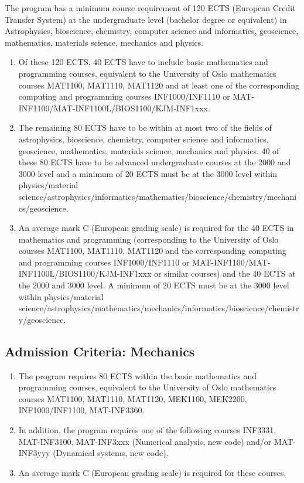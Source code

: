 \documentclass[%
oneside,                 %
final,                   %
10pt]{article}
\begin{document}
The program has a minimum course requirement of 120 ECTS (European Credit Transfer System) at the undergraduate level (bachelor degree or equivalent) in Astrophysics, bioscience, chemistry, computer science and informatics, geoscience, mathematics, materials science, mechanics and physics. 
\begin{enumerate}
\item Of these 120 ECTS, 40 ECTS have to include basic mathematics and programming courses, equivalent to the University of Oslo mathematics courses MAT1100, MAT1110, MAT1120 and at least one of the corresponding computing and programming courses INF1000/INF1110 or MAT-INF1100/MAT-INF1100L/BIOS1100/KJM-INF1xxx. 

\item The remaining 80 ECTS have to be within at most two of the fields of astrophysics, bioscience, chemistry, computer science and informatics, geoscience, mathematics, materials science, mechanics and physics. 40 of these 80 ECTS have to be advanced undergraduate courses at the 2000 and 3000 level and a minimum of 20 ECTS must be at the 3000 level within physics/material science/astrophysics/informatics/mathematics/bioscience/chemistry/mechanics/geoscience.

\item An average mark C (European grading scale) is required for the 40 ECTS in mathematics and programming (corresponding  to the University of Oslo courses  MAT1100, MAT1110, MAT1120  and the corresponding computing and programming courses INF1000/INF1110 or MAT-INF1100/MAT-INF1100L/BIOS1100/KJM-INF1xxx or similar courses) and the 40 ECTS at the 2000 and 3000 level. A minimum of 20 ECTS must be at the 3000 level within physics/material science/astrophysics/mathematics/mechanics/informatics/bioscience/chemistry/geoscience.
\end{enumerate}

\noindent
\subsection*{Admission Criteria: Mechanics}

\begin{enumerate}
\item The program requires 80 ECTS within the  basic mathematics and programming courses, equivalent to the University of Oslo mathematics courses MAT1100, MAT1110, MAT1120, MEK1100, MEK2200, INF1000/INF1100, MAT-INF3360.

\item In addition, the program requires  one of the following courses INF3331, MAT-INF3100, MAT-INF3xxx (Numerical analysis, new code) and/or MAT-INF3yyy (Dynamical systems, new code). 

\item An average mark C (European grading scale) is required for these courses.
\end{enumerate}
\end{document}
